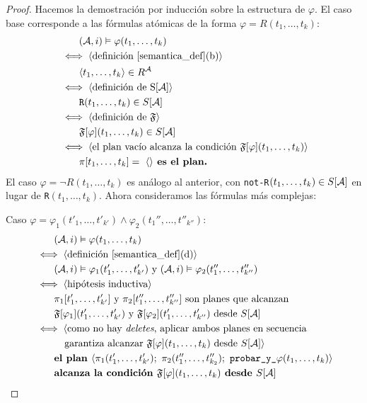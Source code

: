 \begin{proof}
Hacemos la demostración por inducción sobre la estructura de $\varphi$. El caso
base corresponde a las fórmulas atómicas de la forma $\varphi =
R(t_1,\ldots,t_k)$:
\begin{alignat*}{1}
& \quad \quad (\mathcal{A}, i) \vDash \varphi(t_1,\ldots,t_k)\\
& \iff \langle \text{definición \ref{semantica_def}(b)} \rangle \\
& \quad \quad \langle t_1,\ldots,t_k \rangle \in R^{\mathcal{A}}\\
& \iff \langle \text{definición de S[\ensuremath{\mathcal{A}}]} \rangle\\
& \quad \quad \texttt{R}(t_1,\ldots,t_k) \in S[\mathcal{A}]\\
& \iff \langle \text{definición de } \mathfrak{F} \rangle\\
& \quad \quad \mathfrak{F}[\varphi](t_1,\ldots,t_k) \in S[\mathcal{A}]\\
& \iff \langle \text{el plan vacío alcanza la condición } \mathfrak{F}[\varphi](t_1,\ldots,t_k) \rangle\\
& \quad \quad \pi[t_1,\ldots,t_k] =\ \langle  \rangle \textbf{ es el plan.}
\end{alignat*}
El caso $\varphi = \neg R(t_1,\ldots,t_k)$ es análogo al anterior, con
\texttt{not-R}$(t_1,\ldots,t_k) \in S[\mathcal{A}]$ en lugar de \texttt{R}$(t_1,\ldots,t_k)$.
Ahora consideramos las fórmulas más complejas:

Caso $\varphi = \varphi_1(t'_1,\ldots,t'_{k'}) \land \varphi_2(t_1'',\ldots,t''_{k''}) $:
\begin{alignat*}{1}
& \quad \quad (\A, i) \models \varphi(t_1,\ldots,t_k)\\
& \iff \tup{\text{definición \ref{semantica_def}(d)}}\\
& \quad \quad (\A, i) \models \varphi_1(t'_1,\ldots,t'_{k'}) \text{ y } 
(\A, i) \models \varphi_2(t''_1,\ldots,t''_{k''})\\
& \iff \tup{\text{hipótesis inductiva}}\\
& \quad \quad \pi_1[t'_1,\ldots,t'_{k'}] \text{ y } 
\pi_2[t_1'',\ldots,t''_{k''}] \text{ son planes que alcanzan }\\
& \quad \quad \FT[\varphi_1](t'_1,\ldots,t'_{k'}) \text{ y } \FT[\varphi_2](t'_1,\ldots,t'_{k''})
\text{ desde } S[\A]\\
& \iff \langle \text{como no hay \textit{deletes}, aplicar ambos planes en
secuencia }\\
& {\color{white}\iff\langle} \text{garantiza alcanzar
$\FT[\varphi](t_1,\ldots,t_k)$ desde $S[\A]$} \rangle\\
& \quad \quad \textbf{el plan }\tup{\pi_1(t'_1,\ldots,t'_{k'});\
\pi_2(t_1'',\ldots,t_{k_2}'');\ \texttt{probar\_y\_}\varphi(t_1,\ldots,t_k)} \\
& \quad \quad \textbf{alcanza la condición }
\FT[\varphi](t_1,\ldots,t_k) \textbf{ desde } S[\A]
\end{alignat*}


\end{proof}
